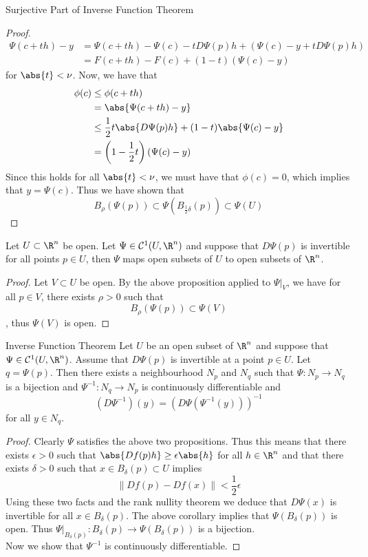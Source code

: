 \documentclass[a4paper]{article}
\begin{document}
\begin{prp}{Surjective Part of Inverse Function Theorem}{}
\begin{proof}
\begin{align*}
\Psi(c+th)-y&=\Psi(c+th)-\Psi(c)-tD\Psi(p)h+(\Psi(c)-y+tD\Psi(p)h)\\
&=F(c+th)-F(c)+(1-t)(\Psi(c)-y)
\end{align*}
for $\abs{t}<\nu$. 
Now, we have that 
\begin{align*}
\phi(c)&\leq\phi(c+th)\\
&=\abs{\Psi(c+th)-y}\\
&\leq\frac{1}{2}t\abs{D\Psi(p)h}+(1-t)\abs{\Psi(c)-y}\\
&=\left(1-\frac{1}{2}t\right)(\Psi(c)-y)
\end{align*}
Since this holds for all $\abs{t}<\nu$, we must have that $\phi(c)=0$, which implies that $y=\Psi(c)$. Thus we have shown that $$B_\rho(\Psi(p))\subset\Psi(B_{\frac{1}{2}\delta}(p))\subset\Psi(U)$$
\end{proof}
\end{prp}

\begin{crl}{}{} Let $U\subset\R^n$ be open. Let $\Psi\in\mathcal{C}^1(U,\R^n)$ and suppose that $D\Psi(p)$ is invertible for all points $p\in U$, then $\Psi$ maps open subsets of $U$ to open subsets of $\R^n$. 
\begin{proof}
Let $V\subset U$ be open. By the above proposition applied to $\Psi|_V$, we have for all $p\in V$, there exists $\rho>0$ such that $$B_{\rho}(\Psi(p))\subset\Psi(V)$$, thus $\Psi(V)$ is open. 
\end{proof}
\end{crl}

\begin{thm}{Inverse Function Theorem}{} Let $U$ be an open subset of $\R^n$ and suppose that $\Psi\in\mathcal{C}^1(U,\R^n)$. Assume that $D\Psi(p)$ is invertible at a point $p\in U$. Let $q=\Psi(p)$. Then there exists a neighbourhood $N_p$ and $N_q$ such that $\Psi:N_p\to N_q$ is a bijection and $\Psi^{-1}:N_q\to N_p$ is continuously differentiable and $$(D\Psi^{-1})(y)=(D\Psi(\Psi^{-1}(y)))^{-1}$$ for all $y\in N_q$. 
\begin{proof}
Clearly $\Psi$ satisfies the above two propositions. Thus this means that there exists $\epsilon>0$ such that $\abs{Df(p)h}\geq\epsilon\abs{h}$ for all $h\in\R^n$ and that there exists $\delta>0$ such that $x\in B_\delta(p)\subset U$ implies $$\|Df(p)-Df(x)\|<\frac{1}{2}\epsilon$$ Using these two facts and the rank nullity theorem we deduce that $D\Psi(x)$ is invertible for all $x\in B_\delta(p)$. The above corollary implies that $\Psi(B_\delta(p))$ is open. Thus $\Psi|_{B_\delta(p)}:B_\delta(p)\to\Psi(B_\delta(p))$ is a bijection. \\
Now we show that $\Psi^{-1}$ is continuously differentiable. 
\end{proof}
\end{thm}
\end{document}
